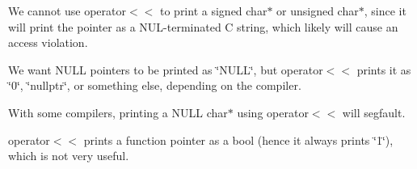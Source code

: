 \begin{DoxyItemize}
\item We cannot use {\ttfamily operator$<$$<$} to print a {\ttfamily signed char$\ast$} or {\ttfamily unsigned char$\ast$}, since it will print the pointer as a N\+U\+L-\/terminated C string, which likely will cause an access violation.
\item We want {\ttfamily N\+U\+LL} pointers to be printed as {\ttfamily \char`\"{}\+N\+U\+L\+L\char`\"{}}, but {\ttfamily operator$<$$<$} prints it as {\ttfamily \char`\"{}0\char`\"{}}, {\ttfamily \char`\"{}nullptr\char`\"{}}, or something else, depending on the compiler.
\item With some compilers, printing a {\ttfamily N\+U\+LL} {\ttfamily char$\ast$} using {\ttfamily operator$<$$<$} will segfault.
\item {\ttfamily operator$<$$<$} prints a function pointer as a {\ttfamily bool} (hence it always prints {\ttfamily \char`\"{}1\char`\"{}}), which is not very useful. 
\end{DoxyItemize}